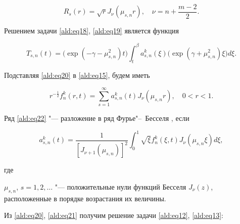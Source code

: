 \begin{equation}

R_s(r) = \sqrt{r}J_\nu(\mu_{s,n} r),\quad \nu = n+\frac{m-2}{2}.

\label{ald:eq20}

\end{equation}





Решением задачи \eqref{ald:eq18}, \eqref{ald:eq19} является функция~\cite[c.~35, п.~4.3]{aldash:7}

\begin{equation}

T_{s,n}(t) =  \bigl(\exp (-\gamma-\mu_{s,n}^2)t\bigr) 

\int _{t}^{\beta} a_{s,n}^k(\xi) \bigl(\exp (\gamma + \mu_{s,n}^2)\xi \bigr) d \xi.

\label{ald:eq21}

\end{equation}



Подставляя \eqref{ald:eq20} в \eqref{ald:eq15}, будем иметь

\begin{equation}

r^{-\frac{1}{2}} f_n^k(r,t)=\sum\limits_{s=1}^{\infty} a_{s,n}^k(t)

J_{\nu}(\mu_{s,n} r),\quad  0<r<1.

\label{ald:eq22}

\end{equation}



Ряд \eqref{ald:eq22} "--- разложение в ряд Фурье"--~Бесселя \cite{aldash:8}, если

\begin{equation}

a_{s,n}^k(t)=

\dfrac{1}{[J_{\nu+1}(\mu_{s,n})]^{2}}\int _{0}^{1}\sqrt{\xi}f_n^k(\xi,t)J_{\nu}(\mu_{s,n}

\xi)d\xi,

\label{ald:eq23}

\end{equation}

где

$\mu_{s,n}$, $ s= 1,2,\dots$ "--- положительные нули функций Бесселя $J_\nu(z)$, расположенные в порядке возрастания их величины.



Из \eqref{ald:eq20}, \eqref{ald:eq21} получим решение задачи \eqref{ald:eq12}, \eqref{ald:eq13}:

